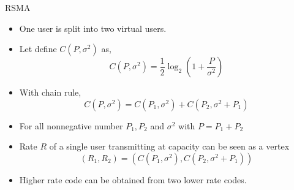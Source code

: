 \documentclass[10pt]{beamer}
\begin{document}
\begin{frame}[t]{RSMA }
\begin{itemize}
	\item One user is split into two virtual users.
	\item Let define $C(P, \sigma^2)$ as,
 \begin{equation}
		C( P, \sigma^2) = \frac{1}{2}\log_2\left( 1 + \frac{P}{\sigma^2}\right)
\end{equation}
\item With chain rule,
\begin{equation}
	C(P, \sigma^2) = C(P_1, \sigma^2) + C(P_2, \sigma^2 + P_1)
\end{equation}
\item For all nonnegative number $P_1, P_2$ and $\sigma^2$ with $P = P_1 + P_2$
\item Rate $R$ of a single user transmitting at capacity can be seen as a vertex
\begin{equation}
	\left( R_1, R_2 \right) = \left( C(P_1, \sigma^2), C(P_2, \sigma^2+P_1)\right)
\end{equation}
\item Higher rate code can be obtained from two lower rate codes.
\end{itemize}
\end{frame}
\end{document}
